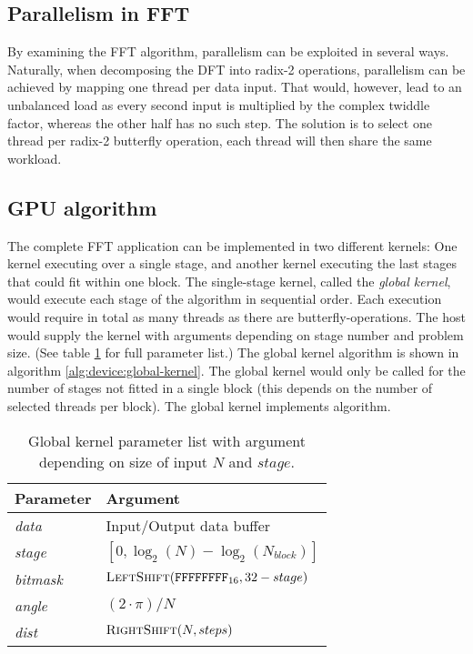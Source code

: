 \subsection{Parallelism in FFT}

By examining the \gls{FFT} algorithm, parallelism can be exploited in several ways. Naturally, when decomposing the \gls{DFT} into radix-2 operations, parallelism can be achieved by mapping one thread per data input. That would, however, lead to an unbalanced load as every second input is multiplied by the complex twiddle factor, whereas the other half has no such step. The solution is to select one thread per radix-2 butterfly operation, each thread will then share the same workload.

\subsection{GPU algorithm}

The complete \gls{FFT} application can be implemented in two different kernels: One kernel executing over a single stage, and another kernel executing the last stages that could fit within one block. The single-stage kernel, called the \emph{global kernel}, would execute each stage of the algorithm in sequential order. Each execution would require in total as many threads as there are butterfly-operations. The host would supply the kernel with arguments depending on stage number and problem size. (See table \ref{tab:global-kernel} for full parameter list.) The global kernel algorithm is shown in algorithm \ref{alg:device:global-kernel}. The global kernel would only be called for the number of stages not fitted in a single block (this depends on the number of selected threads per block). The global kernel implements {\CTALG} algorithm.

\begin{table}
	\centering
	\begin{tabular}{|l|l|}
		\hline
		Parameter & Argument \\ \hline
		\textit{data} & Input/Output data buffer \\ \hline
		\textit{stage} & $[0,\log_{2}(N) - \log_{2}(N_{block})]$ \\ \hline
		\textit{bitmask} & $\Call{LeftShift}{\texttt{FFFFFFFF}_{16}, 32 - stage}$ \\ \hline
		\textit{angle} & $(2 \cdot \pi)/N$ \\ \hline
		\textit{dist} & $\Call{RightShift}{N, steps}$ \\ \hline		
	\end{tabular}
	\caption{Global kernel parameter list with argument depending on size of input $N$ and $stage$.}
	\label{tab:global-kernel}
\end{table}

